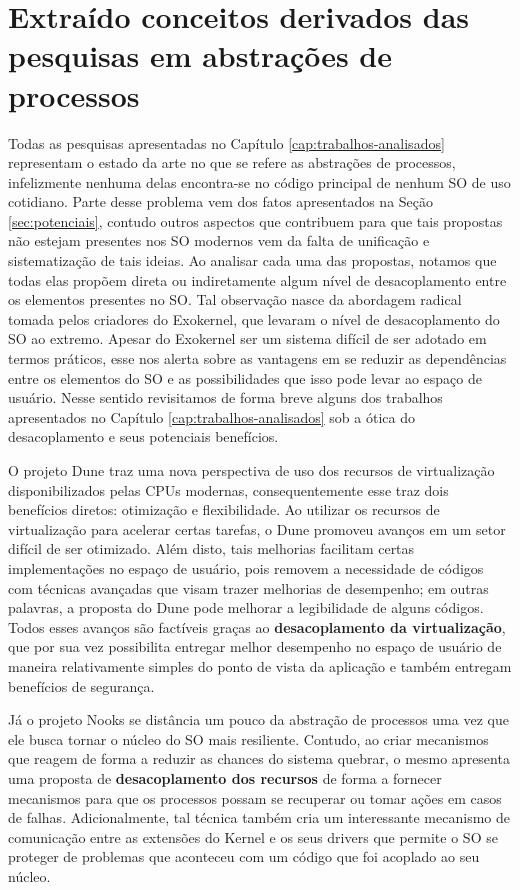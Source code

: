

\section{Extraído conceitos derivados das pesquisas em abstrações de processos}

Todas as pesquisas apresentadas no Capítulo \ref{cap:trabalhos-analisados}
representam o estado da arte no que se refere as abstrações de processos,
infelizmente nenhuma delas encontra-se no código principal de nenhum SO de uso
cotidiano. Parte desse problema vem dos fatos apresentados na Seção
\ref{sec:potenciais}, contudo outros aspectos que contribuem para que tais
propostas não estejam presentes nos SO modernos vem da falta de unificação e
sistematização de tais ideias. Ao analisar cada uma das propostas, notamos que
todas elas propõem direta ou indiretamente algum nível de desacoplamento entre
os elementos presentes no SO. Tal observação nasce da abordagem radical tomada
pelos criadores do Exokernel, que levaram o nível de desacoplamento do SO ao
extremo. Apesar do Exokernel ser um sistema difícil de ser adotado em termos
práticos, esse nos alerta sobre as vantagens em se reduzir as dependências
entre os elementos do SO e as possibilidades que isso pode levar ao espaço de
usuário. Nesse sentido revisitamos de forma breve alguns dos trabalhos
apresentados no Capítulo \ref{cap:trabalhos-analisados} sob a ótica do
desacoplamento e seus potenciais benefícios.

O projeto Dune traz uma nova perspectiva de uso dos recursos de virtualização
disponibilizados pelas CPUs modernas, consequentemente esse traz dois
benefícios diretos: otimização e flexibilidade. Ao utilizar os recursos de
virtualização para acelerar certas tarefas, o Dune promoveu avanços em um setor
difícil de ser otimizado. Além disto, tais melhorias facilitam certas
implementações no espaço de usuário, pois removem a necessidade de códigos com
técnicas avançadas que visam trazer melhorias de desempenho; em outras
palavras, a proposta do Dune pode melhorar a legibilidade de alguns códigos.
Todos esses avanços são factíveis graças ao \textbf{desacoplamento da
virtualização}, que por sua vez possibilita entregar melhor desempenho no
espaço de usuário de maneira relativamente simples do ponto de vista da
aplicação e também entregam benefícios de segurança.

Já o projeto Nooks se distância um pouco da abstração de processos uma vez que
ele busca tornar o núcleo do SO mais resiliente. Contudo, ao criar mecanismos
que reagem de forma a reduzir as chances do sistema quebrar, o mesmo apresenta
uma proposta de \textbf{desacoplamento dos recursos} de forma a fornecer
mecanismos para que os processos possam se recuperar ou tomar ações em casos de
falhas.  Adicionalmente, tal técnica também cria um interessante mecanismo de
comunicação entre as extensões do Kernel e os seus drivers que permite o SO se
proteger de problemas que aconteceu com um código que foi acoplado ao seu
núcleo.

